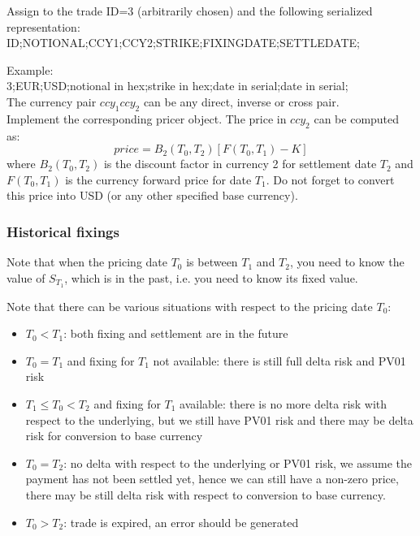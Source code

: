 \documentclass[10pt]{article}
\begin{document}
Assign to the trade ID=3 (arbitrarily chosen) and the following serialized representation:\\
ID;NOTIONAL;CCY1;CCY2;STRIKE;FIXINGDATE;SETTLEDATE;

\noindent Example:\\
3;EUR;USD;notional in hex;strike in hex;date in serial;date in serial;\\

The currency pair $ccy_1ccy_2$ can be any direct, inverse or cross pair.\\

Implement the corresponding pricer object. The price in $ccy_2$ can be computed as:
$$
price=B_2(T_0, T_2)[F(T_0,T_1)-K]
$$
where $B_2(T_0,T_2)$ is the discount factor in currency 2 for settlement date $T_2$ and $F(T_0,T_1)$ is the currency forward price for date $T_1$. Do not forget to convert this price into USD (or any other specified base currency).

\subsubsection{Historical fixings}
Note that when the pricing date $T_0$ is between $T_1$ and $T_2$, you need to know the value of $S_{T_1}$, which is in the past, i.e. you need to know its fixed value. 

Note that there can be various situations with respect to the pricing date $T_0$:
\begin{itemize}
	\item $T_0< T_1$: both fixing and settlement are in the future
	\item $T_0 = T_1$ and fixing for $T_1$ not available: there is still full delta risk and PV01 risk
	\item $ T_1 \leq T_0 < T_2$ and fixing for $T_1$ available: there is no more delta risk with respect to the underlying, but we still have PV01 risk and there may be delta risk for conversion to base currency
	\item $T_0 = T_2$: no delta with respect to the underlying or PV01 risk, we assume the payment has not been settled yet, hence we can still have a non-zero price, there may be still delta risk with respect to conversion to base currency.
	\item $T_0 > T_2$: trade is expired, an error should be generated
\end{itemize}
\end{document}
